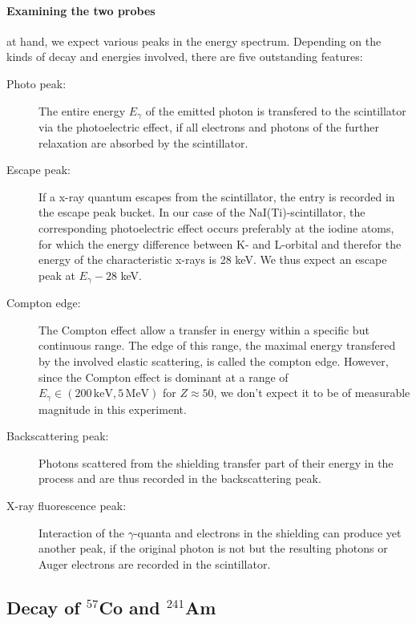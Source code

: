 \paragraph{Examining the two probes}
at hand, we expect various peaks in the energy spectrum. 
Depending on the kinds of decay and energies involved, there are five outstanding features:~\cite{ver}
\begin{description}
    \item [Photo peak:] 
        The entire energy $E_\gamma$ of the emitted photon is transfered to the scintillator 
        via the photoelectric effect, if all electrons and photons of the further relaxation are 
        absorbed by the scintillator.
    \item [Escape peak:] 
        If a x-ray quantum escapes from the scintillator, the entry is recorded in the 
        escape peak bucket. In our case of the NaI(Ti)-scintillator, the corresponding photoelectric 
        effect occurs preferably at the iodine atoms, for which the energy difference between K- and L-orbital 
        and therefor the energy of the characteristic x-rays is 28 keV. We thus expect an escape peak 
        at $E_\gamma - 28$ keV. 
    \item [Compton edge:] 
        The Compton effect allow a transfer in energy within a specific but continuous range. 
        The edge of this range, the maximal energy transfered by the involved elastic scattering, 
        is called the compton edge. However, since the Compton effect is dominant at a range of 
        $E_\gamma \in (200\, \mathrm{keV}, 5\, \mathrm{MeV})$ for $Z \approx 50$, we don't expect it to be of 
        measurable magnitude in this experiment. 
    \item [Backscattering peak:] 
        Photons scattered from the shielding transfer part of their energy in the process 
        and are thus recorded in the backscattering peak. 
    \item [X-ray fluorescence peak:] 
        Interaction of the $\gamma$-quanta and electrons in the shielding can produce 
        yet another peak, if the original photon is not but the resulting photons or 
        Auger electrons are recorded in the scintillator. 
\end{description}

\subsection{Decay of $^{57}$Co and $^{241}$Am}
